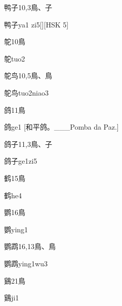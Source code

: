 \begin{entry}{鸭子}{10,3}{⿃、⼦}
  \begin{phonetics}{鸭子}{ya1 zi5}[][HSK 5]
  \end{phonetics}
\end{entry}

\begin{entry}{鸵}{10}{⿃}
  \begin{phonetics}{鸵}{tuo2}
  \end{phonetics}
\end{entry}

\begin{entry}{鸵鸟}{10,5}{⿃、⿃}
  \begin{phonetics}{鸵鸟}{tuo2niao3}
  \end{phonetics}
\end{entry}

\begin{entry}{鸽}{11}{⿃}
  \begin{phonetics}{鸽}{ge1}
    [和平鸽。___Pomba da Paz.]
  \end{phonetics}
\end{entry}

\begin{entry}{鸽子}{11,3}{⿃、⼦}
  \begin{phonetics}{鸽子}{ge1zi5}
  \end{phonetics}
\end{entry}

\begin{entry}{鹤}{15}{⿃}
  \begin{phonetics}{鹤}{he4}
  \end{phonetics}
\end{entry}

\begin{entry}{鹦}{16}{⿃}
  \begin{phonetics}{鹦}{ying1}
  \end{phonetics}
\end{entry}

\begin{entry}{鹦鹉}{16,13}{⿃、⿃}
  \begin{phonetics}{鹦鹉}{ying1wu3}
  \end{phonetics}
\end{entry}

\begin{entry}{鷄}{21}{⿃}
  \begin{phonetics}{鷄}{ji1}
  \end{phonetics}
\end{entry}


